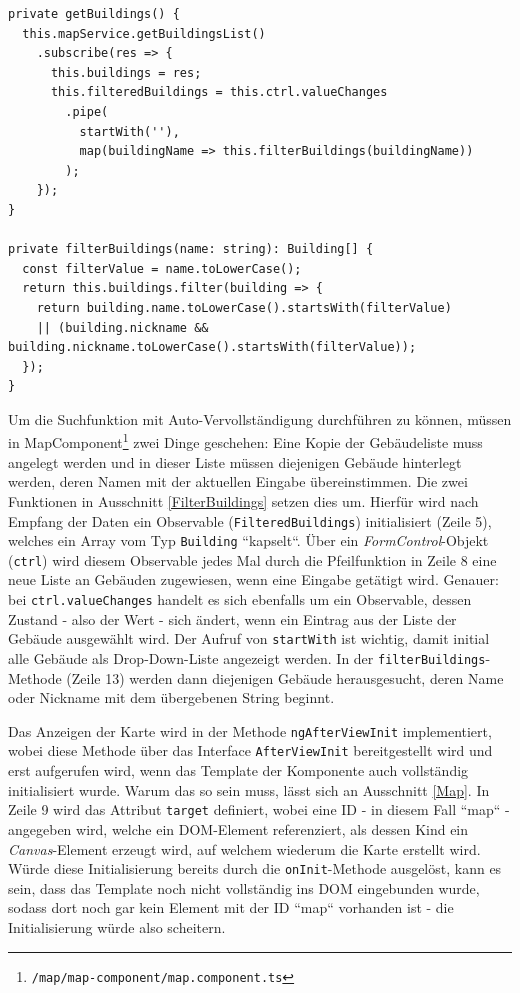 \begin{lstlisting}[float, floatplacement=h, style=htmlcssjs, caption={Auszug aus MapComponent}, label={FilterBuildings}]
private getBuildings() {
  this.mapService.getBuildingsList()
    .subscribe(res => {
      this.buildings = res;
      this.filteredBuildings = this.ctrl.valueChanges
        .pipe(
          startWith(''),
          map(buildingName => this.filterBuildings(buildingName))
        );
    });
}

private filterBuildings(name: string): Building[] {
  const filterValue = name.toLowerCase();
  return this.buildings.filter(building => {
    return building.name.toLowerCase().startsWith(filterValue)
    || (building.nickname && building.nickname.toLowerCase().startsWith(filterValue));
  });
}
\end{lstlisting}
Um die Suchfunktion mit Auto-Vervollständigung durchführen zu können, müssen in MapComponent\footnote{\texttt{\texttt{/map/map-component/map.component.ts}}} zwei Dinge geschehen: Eine Kopie der Gebäudeliste muss angelegt werden und in dieser Liste müssen diejenigen Gebäude hinterlegt werden, deren Namen mit der aktuellen Eingabe übereinstimmen. Die zwei Funktionen in Ausschnitt \ref{FilterBuildings} setzen dies um. Hierfür wird nach Empfang der Daten ein Observable (\texttt{FilteredBuildings}) initialisiert (Zeile 5), welches ein Array vom Typ \texttt{Building} ``kapselt``. Über ein \textit{FormControl}-Objekt (\texttt{ctrl}) wird diesem Observable jedes Mal durch die Pfeilfunktion in Zeile 8 eine neue Liste an Gebäuden zugewiesen, wenn eine Eingabe getätigt wird. Genauer: bei \texttt{ctrl.valueChanges} handelt es sich ebenfalls um ein Observable, dessen Zustand - also der Wert - sich ändert, wenn ein Eintrag aus der Liste der Gebäude ausgewählt wird. Der Aufruf von \texttt{startWith} ist wichtig, damit initial alle Gebäude als Drop-Down-Liste angezeigt werden. In der \texttt{filterBuildings}-Methode (Zeile 13) werden dann diejenigen Gebäude herausgesucht, deren Name oder Nickname mit dem übergebenen String beginnt.

Das Anzeigen der Karte wird in der Methode \texttt{ngAfterViewInit} implementiert, wobei diese Methode über das Interface \texttt{AfterViewInit} bereitgestellt wird und erst aufgerufen wird, wenn das Template der Komponente auch vollständig initialisiert wurde. Warum das so sein muss, lässt sich an Ausschnitt \ref{Map}. In Zeile 9 wird das Attribut \texttt{target} definiert, wobei eine ID - in diesem Fall ``map`` - angegeben wird, welche ein \acs{DOM}-Element referenziert, als dessen Kind ein \textit{Canvas}-Element erzeugt wird, auf welchem wiederum die Karte erstellt wird. Würde diese Initialisierung bereits durch die \texttt{onInit}-Methode ausgelöst, kann es sein, dass das Template noch nicht vollständig ins \acs{DOM} eingebunden wurde, sodass dort noch gar kein Element mit der ID ``map`` vorhanden ist - die Initialisierung würde also scheitern.

